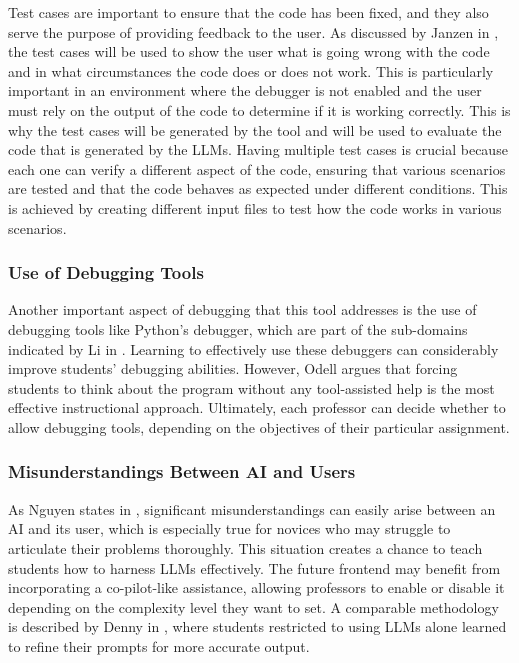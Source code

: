 \documentclass[12pt]{extarticle}
\begin{document}
Test cases are important to ensure that the code has been fixed, and they also serve the purpose of providing feedback to the user. As discussed by Janzen in \cite{Janzen2008}, the test cases will be used to show the user what is going wrong with the code and in what circumstances the code does or does not work. This is particularly important in an environment where the debugger is not enabled and the user must rely on the output of the code to determine if it is working correctly. This is why the test cases will be generated by the tool and will be used to evaluate the code that is generated by the LLMs. Having multiple test cases is crucial because each one can verify a different aspect of the code, ensuring that various scenarios are tested and that the code behaves as expected under different conditions. This is achieved by creating different input files to test how the code works in various scenarios.

\subsubsection{Use of Debugging Tools}

Another important aspect of debugging that this tool addresses is the use of debugging tools like Python’s debugger, which are part of the sub-domains indicated by Li in \cite{li2019}. Learning to effectively use these debuggers can considerably improve students’ debugging abilities. However, Odell \cite{odell2017} argues that forcing students to think about the program without any tool-assisted help is the most effective instructional approach. Ultimately, each professor can decide whether to allow debugging tools, depending on the objectives of their particular assignment.

\subsubsection{Misunderstandings Between AI and Users}

As Nguyen states in \cite{nguyen2024}, significant misunderstandings can easily arise between an AI and its user, which is especially true for novices who may struggle to articulate their problems thoroughly. This situation creates a chance to teach students how to harness LLMs effectively. The future frontend may benefit from incorporating a co-pilot-like assistance, allowing professors to enable or disable it depending on the complexity level they want to set. A comparable methodology is described by Denny in \cite{denny2023}, where students restricted to using LLMs alone learned to refine their prompts for more accurate output.
\end{document}
